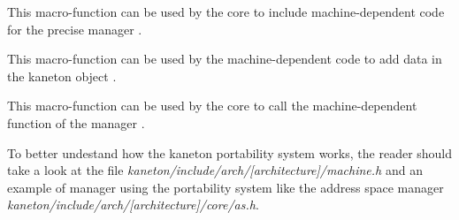 	 {
	   This macro-function can be used by the core to include
	   machine-dependent code for the precise manager .
	 }

	 {
	   This macro-function can be used by the machine-dependent code
	   to add data in the kaneton object .
	 }

	 {
	   This macro-function can be used by the core to call the
	   machine-dependent function  of the manager
	   .
	 }

To better undestand how the kaneton portability system works, the reader
should take a look at the file
\textit{kaneton/include/arch/[architecture]/machine.h}
and an example of manager using the portability system like the address
space manager
\textit{kaneton/include/arch/[architecture]/core/as.h}.
